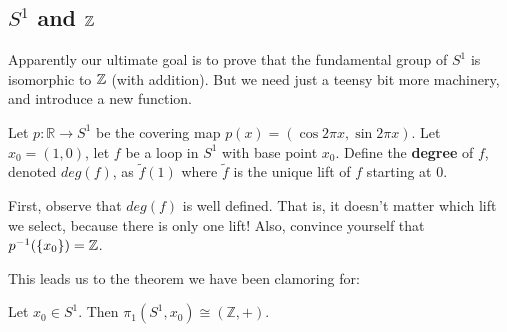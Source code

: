     \subsection{$S^1$ and $\mathbb Z$}
   	Apparently our ultimate goal is to prove that the fundamental group of $S^1$ is isomorphic to $\mathbb Z$ (with addition). But we need just a teensy bit more machinery, and introduce a new function.
   	\begin{definition}
   	Let $p: \mathbb{R}\to S^1$ be the covering map $p(x)=(\cos 2\pi x, \sin 2\pi x)$. Let $x_0=(1,0)$, let $f$ be a loop in $S^1$ with base point $x_0$. Define the \textbf{degree} of $f$, denoted $deg(f)$, as $\tilde{f}(1)$ where $\tilde{f}$ is the unique lift of $f$ starting at $0$.
   	\end{definition}
        
    First, observe that $deg(f)$ is well defined. That is, it doesn't matter which lift we select, because there is only one lift! Also, convince yourself that $p^{-1}(\left\{x_0\right\})=\mathbb Z$.
    
This leads us to the theorem we have been clamoring for:

\begin{theorem}
Let $x_0\in S^1$. Then $\pi_1(S^1,x_0)\cong (\mathbb{Z},+)$.
\end{theorem}

